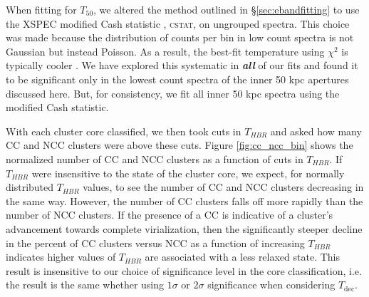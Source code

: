 When fitting for $T_{50}$, we altered the method outlined in
\S\ref{sec:ebandfitting} to use the {\textsc{XSPEC}} modified Cash
statistic \citep{1979ApJ...228..939C}, {\textsc{cstat}}, on ungrouped
spectra. This choice was made because the distribution of counts per
bin in low count spectra is not Gaussian but instead Poisson. As a
result, the best-fit temperature using $\chi^2$ is typically cooler
\citep{1989ApJ...342.1207N, 2007A&A...462..429B}. We have explored
this systematic in {\bfseries\em{all}} of our fits and found it to be
significant only in the lowest count spectra of the inner 50 kpc
apertures discussed here. But, for consistency, we fit all inner 50
kpc spectra using the modified Cash statistic.

With each cluster core classified, we then took cuts in $T_{HBR}$ 
and asked how many CC and NCC clusters were above these cuts. 
Figure \ref{fig:cc_ncc_bin} shows the normalized number of CC and NCC
clusters as a function of cuts in $T_{HBR}$. If $T_{HBR}$ were
insensitive to the state of the cluster core, we expect, for normally
distributed $T_{HBR}$ values, to see the number of CC and NCC clusters
decreasing in the same way. However, the number of CC clusters falls
off more rapidly than the number of NCC clusters. If the presence of a
CC is indicative of a cluster's advancement towards complete
virialization, then the significantly steeper decline in the percent
of CC clusters versus NCC as a function of increasing $T_{HBR}$
indicates higher values of $T_{HBR}$ are associated with a less
relaxed state. This result is insensitive to our choice of
significance level in the core classification, i.e. the result is the
same whether using $1\sigma$ or $2\sigma$ significance when
considering $T_{\mathrm{dec}}$.

